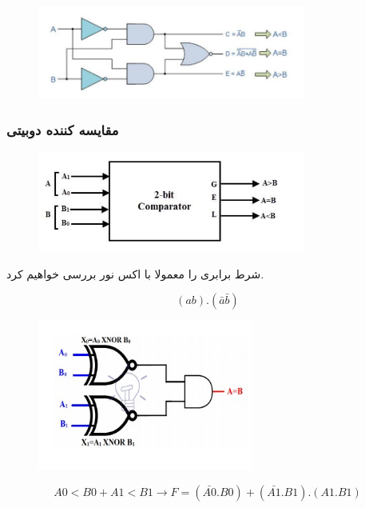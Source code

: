 \documentclass[20pt, a4paper]{article}
\begin{document}
\begin{figure}[htbp]\centering
	\centerline{\includegraphics[width=250pt]{img/lastest/singleCircuit.jpg}}
\end{figure}

\newpage

\subsubsection{مقایسه کننده دوبیتی}
\begin{figure}[htbp]\centering
	\centerline{\includegraphics[width=250pt]{img/lastest/doubleBitBDiagram.jpg}}
\end{figure}

شرط برابری را معمولا با اکس نور بررسی خواهیم کرد.

\begin{equation}
	(ab).(\bar{a}\bar{b})
\end{equation}

\begin{figure}[htbp]\centering
	\centerline{\includegraphics[width=200pt]{img/lastest/2bitEqual.jpg}}
\end{figure}


\begin{equation}
	A0<B0 + A1<B1 \rightarrow
	F = (\bar{A0}.B0)+(\bar{A1}.B1).(A1.B1)
\end{equation}
\end{document}
